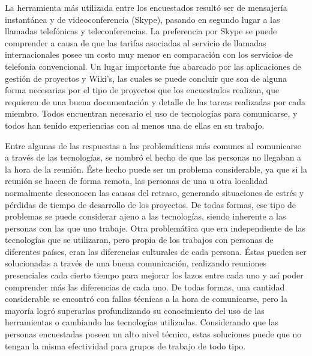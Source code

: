 % 

La herramienta más utilizada entre los encuestados resultó ser de mensajería
instantánea y de videoconferencia (Skype), pasando en segundo lugar a las
llamadas telefónicas y teleconferencias. La preferencia por Skype se puede
comprender a causa de que las tarifas asociadas al servicio de llamadas
internacionales posee un costo muy menor en comparación con los servicios de
telefonía convencional. Un lugar importante fue abarcado por las aplicaciones
de gestión de proyectos y Wiki's, las cuales se puede concluir que son de
alguna forma necesarias por el tipo de proyectos que los encuestados realizan,
que requieren de una buena documentación y detalle de las tareas realizadas
por cada miembro. Todos encuentran necesario el uso de tecnologías para
comunicarse, y todos han tenido experiencias con al menos una de ellas en su
trabajo.

Entre algunas de las respuestas a las problemáticas más comunes al comunicarse
a través de las tecnologías, se nombró el hecho de que las personas no
llegaban a la hora de la reunión. Éste hecho puede ser un problema
considerable, ya que si la reunión se hacen de forma remota, las personas de
una u otra localidad normalmente desconocen las causas del retraso, generando
situaciones de estrés y pérdidas de tiempo de desarrollo de los proyectos. De
todas formas, ese tipo de problemas se puede considerar ajeno a las
tecnologías, siendo inherente a las personas con las que uno trabaje.
Otra problemática que era independiente de las tecnologías que se utilizaran,
pero propia de los trabajos con personas de diferentes países, eran las
diferencias culturales de cada persona. Éstas pueden ser solucionadas a
través de una buena comunicación, realizando reuniones presenciales cada
cierto tiempo para mejorar los lazos entre cada uno y así poder comprender más
las diferencias de cada uno. De todas formas, una cantidad considerable se
encontró con fallas técnicas a la hora de comunicarse, pero la mayoría logró
superarlas profundizando su conocimiento del uso de las herramientas o
cambiando las tecnologías utilizadas. Considerando que las personas
encuestadas poseen un alto nivel técnico, estas soluciones puede que no tengan
la misma efectividad para grupos de trabajo de todo tipo.

